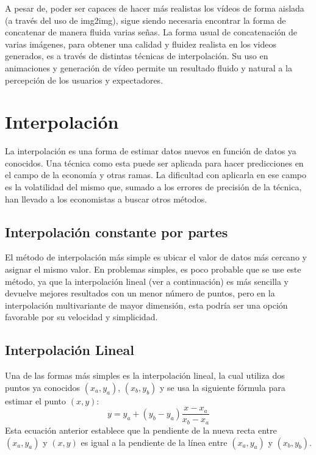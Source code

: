 A pesar de, poder ser capaces de hacer más realistas los vídeos de forma aislada (a través del uso de img2img), sigue siendo necesaria encontrar la forma de concatenar de manera fluida varias señas. La forma usual de concatenación de varias imágenes, para obtener una calidad y fluidez realista en los videos generados, es a través de distintas técnicas de interpolación. Su uso en animaciones y generación de vídeo permite un resultado fluido y natural a la percepción de los usuarios y expectadores.

\section{Interpolación}\label{section:state-of-the-art:interpolation}
La interpolación es una forma de estimar datos nuevos en función de datos ya conocidos. Una técnica como esta puede ser aplicada para hacer predicciones en el campo de la economía y otras ramas. La dificultad con aplicarla en ese campo es la volatilidad del mismo que, sumado a los errores de precisión de la técnica, han llevado a los economistas a buscar otros métodos.\\

\subsection{Interpolación constante por partes}

El método de interpolación más simple es ubicar el valor de datos más cercano y asignar el mismo valor. En problemas simples, es poco probable que se use este método, ya que la interpolación lineal (ver a continuación) es más sencilla y devuelve mejores resultados con un menor número de puntos, pero en la interpolación multivariante de mayor dimensión, esta podría ser una opción favorable por su velocidad y simplicidad.


\subsection{Interpolación Lineal}
Una de las formas más simples es la interpolación lineal, la cual utiliza dos puntos ya conocidos $\left(x_{a}, y_{a} \right) $, $\left( x_{b}, y_{b}\right) $  y se usa la siguiente fórmula para estimar el punto $\left( x, y\right) $:
\begin{equation}
y = y_{a} + \left( y_{b} - y_{a}\right) \frac{x - x_{a}}{x_{b}-x_{a}}
\end{equation}
Esta ecuación anterior establece que la pendiente de la nueva recta entre $ \left(x_{a},y_{a}\right)$ y $\left(x ,y \right)$ es igual a la pendiente de la línea entre $\left(x_{a},y_{a}\right)$ y $\left(x_{b},y_{b}\right)$.\\

